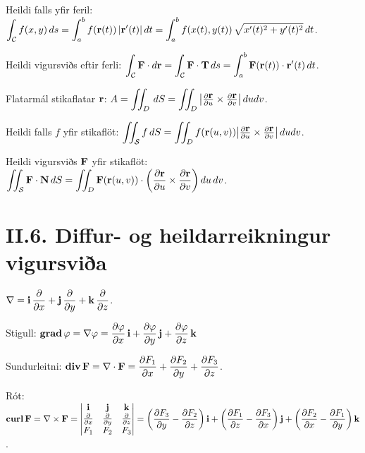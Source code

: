 Heildi falls yfir feril: $\displaystyle 
\int_{\cal C}f(x,y)\,ds =\int_a^b f(\mbox{${\bf r}$}(t))\,|\mbox{${\bf r}$}'(t)|\,dt
 =\int_a^b f(x(t),y(t))\,\sqrt{x'(t)^2+y'(t)^2}\,dt$.

Heildi vigursviðs eftir ferli: $\displaystyle \int_{\cal C} \mbox{${\bf F}$}\cdot d\mbox{${\bf r}$}= \int_{\cal C} \mbox{${\bf F}$}\cdot \mbox{${\bf T}$}\,ds
=\int_a^b \mbox{${\bf F}$}(\mbox{${\bf r}$}(t))\cdot \mbox{${\bf r}$}'(t)\,dt$.

Flatarmál stikaflatar $\mbox{${\bf r}$}$: $\displaystyle A=\int\!\!\!\int_D\,dS=\int\!\!\!\int_D 
\big|{\textstyle\frac{\partial \mbox{${\bf r}$}}{\partial u} 
\times\frac{\partial \mbox{${\bf r}$}}{\partial v}}\big|\,dudv$.

Heildi falls $f$ yfir stikaflöt: $\displaystyle \int\!\!\!\int_{\cal S} f\,dS=\int\!\!\!\int_D f(\mbox{${\bf r}$}(u,v)) \big|{\textstyle\frac{\partial
    \mbox{${\bf r}$}}{\partial u}
\times\frac{\partial \mbox{${\bf r}$}}{\partial v}}\big|\,dudv$.

Heildi vigursviðs $\mbox{${\bf F}$}$ yfir stikaflöt: $\displaystyle \int\!\!\!\int_{\cal S} 
\mbox{${\bf F}$}\cdot\mbox{${\bf N}$}\,dS
=\int\!\!\!\int_D \mbox{${\bf F}$}(\mbox{${\bf r}$}(u,v))\cdot \bigg(
\frac{\partial \mbox{${\bf r}$}}{\partial u}\times\frac{\partial \mbox{${\bf r}$}}{\partial
  v}\bigg)\,
du\,dv$.

\section*{II.6. Diffur- og heildarreikningur vigursviða}

$\displaystyle \nabla=\mbox{${\bf i}$}\,\frac{\partial}{\partial x}+\mbox{${\bf j}$}\,\frac{\partial}{\partial y}+\mbox{${\bf k}$}\,\frac{\partial}{\partial z}$.

Stigull: $\displaystyle \mbox{${\rm\bf grad\,}$}\varphi=\nabla\varphi=\frac{\partial \varphi}{\partial x}\,\mbox{${\bf i}$}+
\frac{\partial \varphi}{\partial y}\,\mbox{${\bf j}$}+\frac{\partial \varphi}{\partial z}\,\mbox{${\bf k}$}$

Sundurleitni: $\displaystyle \mbox{${\rm\bf div\,}$}\mbox{${\bf F}$}=\nabla\cdot\mbox{${\bf F}$}=\frac{\partial F_1}{\partial x}+\frac{\partial F_2}{\partial y}+\frac{\partial F_3}{\partial z}$.

Rót: $\displaystyle
 \mbox{${\rm\bf curl\,}$}\mbox{${\bf F}$}=\nabla\times\mbox{${\bf F}$}=\begin{vmatrix} \mbox{${\bf i}$}&\mbox{${\bf j}$}&\mbox{${\bf k}$}\\
 \frac{\partial} {\partial x}&\frac{\partial}{\partial y}&\frac{\partial}{\partial z}\\F_1&F_2&F_3\end{vmatrix} =\bigg(\frac{\partial F_3}{\partial y}-
 \frac{\partial F_2}{\partial z}\bigg)\,\mbox{${\bf i}$}+\bigg(\frac{\partial F_1}{\partial z}-\frac{\partial F_3}{\partial x}\bigg)\,\mbox{${\bf j}$}+\bigg(\frac{\partial F_2}{\partial x}-\frac{\partial F_1}{\partial y}\bigg)\,\mbox{${\bf k}$}$.

